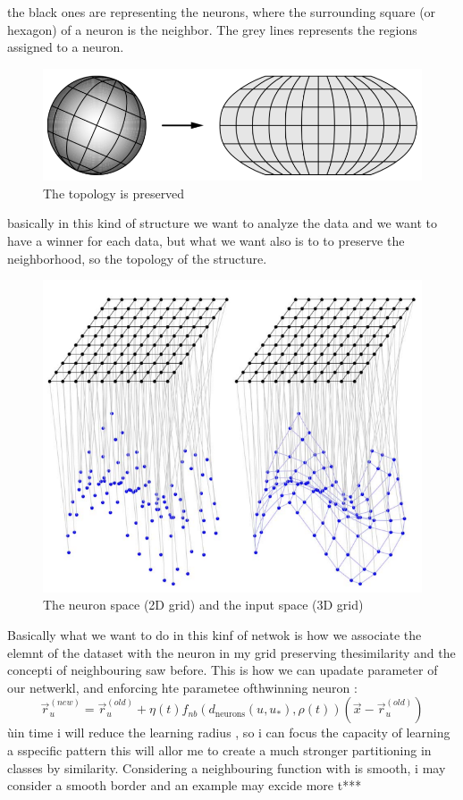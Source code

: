 \documentclass{article}
\begin{document}
the black ones are representing the neurons, where the surrounding square (or hexagon)
of a neuron is the neighbor. The grey lines represents the regions assigned to a neuron.
\begin{figure}[H]
    \centering
    \includegraphics[scale=0.5]{images/topology_sop.png}
    \caption{The topology is preserved}
\end{figure}
basically in this kind of structure we want to analyze the data and we want to have a winner
for each data, but what we want also is to to preserve the neighborhood, so the topology
of the structure.
\begin{figure}[H]
    \centering
    \includegraphics[scale=0.5]{images/neigh_asoc_topo.png}
    \caption{The neuron space (2D grid) and the input space (3D grid)}
\end{figure}

Basically what we want to do in this kinf of netwok is how we associate the elemnt of the dataset with the neuron
in my grid preserving thesimilarity and the concepti of neighbouring saw before. This is how we can upadate
parameter of our netwerkl, and enforcing hte parametee ofthwinning neuron :
$$\vec{r}_u^{(new)} = \vec{r}_u^{(old)} + \eta(t) f_{nb} (d_{\text{neurons}} (u,u_*), \rho (t)) (\vec{x}-\vec{r}_u^{(old)})$$
ùin time i will reduce the learning radius , so i can focus the capacity of learning a sspecific pattern
this will allor me to create a much stronger partitioning in classes by similarity.
Considering a neighbouring function with is smooth, i may consider a smooth border and an example may excide more t***
\end{document}
